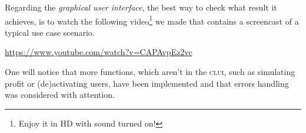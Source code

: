 Regarding the \emph{graphical user interface}, the best way to check what
result it achieves, is to watch the following
video\footnote{Enjoy it in HD with sound turned on!}
we made that contains a screencast of a typical use case scenario.
\begin{center}
  \url{https://www.youtube.com/watch?v=CAPAvpEz2vc}
\end{center}
One will notice that more functions, which aren't in the \textsc{clui},
such as simulating profit or (de)activating users, have been implemented
and that errors handling was considered with attention. 

